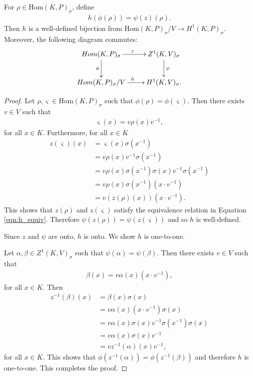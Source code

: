 \begin{lemma} \label{maph}
For $\rho \in \mathrm{Hom}(K, P)_\sigma$, define
\begin{align*}
h(\phi( \rho)) = \psi(z)(\rho).
\end{align*}
Then $h$ is a well-defined bijection from $\mathrm{Hom}(K, P)_\sigma / V \rightarrow H^1(K, P)_\sigma$. Moreover, the following diagram commutes:
  \begin{align*}
    \xymatrix{
    Hom(K, P)_{\sigma} \ar[r]^z \ar[d]_\phi & Z^{1}(K, V)_\sigma \ar[d]^\psi \\
    Hom(K, P)_{\sigma}/V \ar[r]^h & H^{1}(K, V)_\sigma.
    }
  \end{align*}
  \label{lem:v_h1}
\end{lemma}
\begin{proof}  
Let $\rho, \varsigma \in \mathrm{Hom}(K, P)_\sigma$ such that $\phi(\rho) = \phi(\varsigma)$. Then there exists $v \in V$ such that
\begin{align*} \varsigma(x) =  v\rho(x)v^{-1}, \end{align*}
for all $x \in K$. Furthermore, for all $x \in K$
\begin{align*}
z(\varsigma)(x) %
&= \varsigma(x)\sigma(x^{-1}) \\
&= v \rho(x) v^{-1} \sigma(x^{-1}) \\
&= v \rho(x) \sigma(x^{-1})\sigma(x) v^{-1} \sigma(x^{-1}) \\
&= v \rho(x) \sigma(x^{-1}) \left(x \cdot v^{-1}\right) \\
&= v \left(z(\rho)(x)\right) \left(x \cdot v^{-1}\right).
\end{align*}
This shows that $z(\rho)$ and $z(\varsigma)$ satisfy the equivalence relation in Equation \ref{eqn:h_equiv}. Therefore $\psi\left(z(\rho)\right) = \psi\left(z(\varsigma)\right)$ and so $h$ is well-defined.

Since $z$ and $\psi$ are onto, $h$ is onto. We show $h$ is one-to-one.

Let $\alpha, \beta \in Z^1(K, V)_\sigma$ such that $\psi(\alpha) = \psi(\beta)$. Then there exists $v \in V$ such that
\begin{align*} \beta(x) = v \alpha(x) \left(x \cdot v^{-1}\right), \end{align*}
for all $x \in K$. Then
\begin{align*}
z^{-1}(\beta)(x) 
&= \beta(x)\sigma(x) \\
&= v \alpha(x) \left(x \cdot v^{-1}\right) \sigma(x) \\
&= v \alpha(x) \sigma(x) v^{-1} \sigma(x^{-1}) \sigma(x) \\
&= v \alpha(x) \sigma(x) v^{-1} \\
&= v z^{-1}(\alpha)(x) v^{-1},
\end{align*}
for all $x \in K$.
This shows that $\phi\left(z^{-1}(\alpha)\right) = \phi\left(z^{-1}(\beta)\right)$ and therefore $h$ is one-to-one. This completes the proof.
\end{proof}

